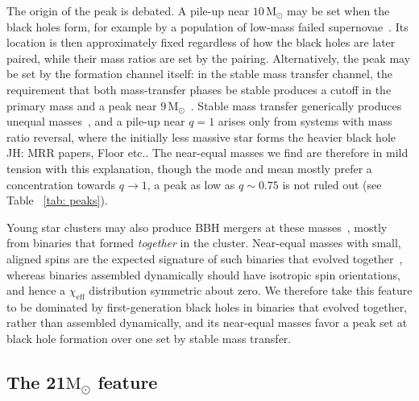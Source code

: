 \documentclass[%
 reprint,
 amsmath,amssymb,
 aps,
 prl,
 nofootinbib,nobibnotes,
]{revtex4-2}
\newcommand{\Msun}{\ensuremath{\mathrm{M}_{\odot}}}
\newcommand{\chieff}{\ensuremath{\chi_{\mathrm{eff}}}}
\newcommand{\jh}[1]{{\color{orange}JH: #1}}
\newcommand{\featTwenty}{21\xspace}
\begin{document}

The origin of the peak is debated. A pile-up near $10\,\Msun$ may be set when the black holes form, for example by a population of low-mass failed supernovae~\cite{Schneider:2020vvh, Schneider:2023mxe, Burrows:2024wqv, Legred:2026oiz}. Its location is then approximately fixed regardless of how the black holes are later paired, while their mass ratios are set by the pairing. Alternatively, the peak may be set by the formation channel itself: in the stable mass transfer channel, the requirement that both mass-transfer phases be stable produces a cutoff in the primary mass and a peak near $9\,\Msun$~\cite{vanSon:2022myr}. Stable mass transfer generically produces unequal masses~\cite{vanSon:2022myr, Godfrey:2026pbc}, and a pile-up near $q = 1$ arises only from systems with mass ratio reversal, where the initially less massive star forms the heavier black hole \jh{MRR papers, Floor etc.}. The near-equal masses we find are therefore in mild tension with this explanation, though the mode and mean mostly prefer a concentration towards $q\to1$, a peak as low as $q\sim 0.75$ is not ruled out (see Table ~\ref{tab: peaks}). 

Young star clusters may also produce \ac{BBH} mergers at these masses~\cite{DiCarlo:2019pmf, Santoliquido:2020bry, Mapelli:2021gyv}, mostly from binaries that formed \textit{together} in the cluster. Near-equal masses with small, aligned spins are the expected signature of such binaries that evolved together~\cite{Zaldarriaga:2017qkw, Qin:2018vaa, Fuller:2019sxi, Bavera:2020inc, Zevin:2022wrw}, whereas binaries assembled dynamically should have isotropic spin orientations, and hence a $\chieff$ distribution symmetric about zero. We therefore take this feature to be dominated by first-generation black holes in binaries that evolved together, rather than assembled dynamically, and its near-equal masses favor a peak set at black hole formation over one set by stable mass transfer.

\subsection{The \featTwenty $\Msun$ feature}
\end{document}
